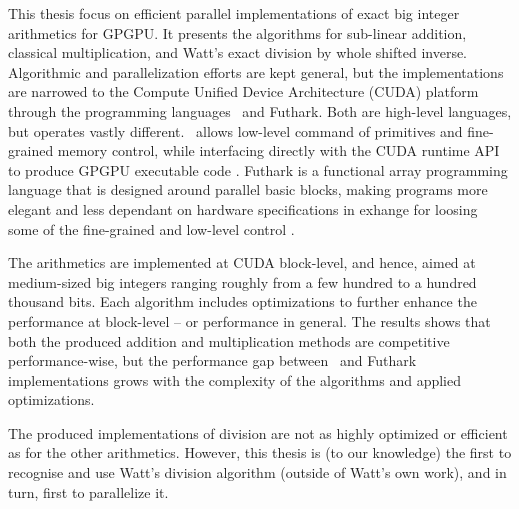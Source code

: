 This thesis focus on efficient parallel implementations of exact big integer
arithmetics for GPGPU. It presents the algorithms for sub-linear addition,
classical multiplication, and Watt's exact division by whole shifted
inverse. Algorithmic and parallelization efforts are kept general, but the
implementations are narrowed to the Compute Unified Device Architecture (CUDA)
platform through the programming languages \cpp\ and Futhark. Both are high-level
languages, but operates vastly different. \cpp\ allows low-level command of
primitives and fine-grained memory control, while interfacing directly with the
CUDA runtime API to produce GPGPU executable code \cite{cudaguide,
  stroustrup}. Futhark is a functional array programming language that is
designed around parallel basic blocks, making programs more elegant and less
dependant on hardware specifications in exhange for loosing some of the
fine-grained and low-level control \cite{ParallelProgrammingInFuthark,
  Henriksen:2017:FPF:3062341.3062354}.

The arithmetics are implemented at CUDA block-level, and hence, aimed at
medium-sized big integers ranging roughly from a few hundred to a hundred
thousand bits. Each algorithm includes optimizations to further enhance the
performance at block-level -- or performance in general. The results shows that
both the produced addition and multiplication methods are competitive
performance-wise, but the performance gap between \cpp\ and Futhark implementations
grows with the complexity of the algorithms and applied optimizations.

The produced implementations of division are not as highly optimized or
efficient as for the other arithmetics. However, this thesis is (to our
knowledge) the first to recognise and use Watt's division algorithm (outside of
Watt's own work), and in turn, first to parallelize it.

